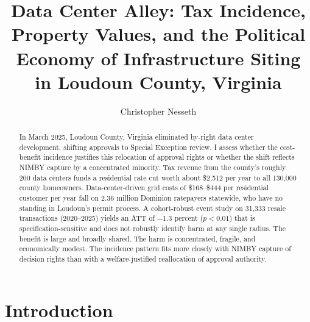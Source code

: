 \documentclass[12pt]{article}
\begin{document}
\title{Data Center Alley:
       Tax Incidence, Property Values, and the Political Economy
       of Infrastructure Siting in Loudoun County, Virginia}

\author{Christopher Nesseth}

\maketitle
\thispagestyle{empty}

\vfill

\begin{abstract}
\singlespacing
\noindent In March 2025, Loudoun County, Virginia eliminated by-right data center development, shifting approvals to Special Exception review. I assess whether the cost-benefit incidence justifies this relocation of approval rights or whether the shift reflects NIMBY capture by a concentrated minority. Tax revenue from the county's roughly 200 data centers funds a residential rate cut worth about \$2,512 per year to all 130,000 county homeowners. Data-center-driven grid costs of \$168--\$444 per residential customer per year fall on 2.36 million Dominion ratepayers statewide, who have no standing in Loudoun's permit process. A \citet{SunAbraham2021} cohort-robust event study on 31,333 resale transactions (2020--2025) yields an ATT of $-1.3$ percent ($p < 0.01$) that is specification-sensitive and does not robustly identify harm at any single radius. The benefit is large and broadly shared. The harm is concentrated, fragile, and economically modest. The incidence pattern fits more closely with NIMBY capture of decision rights than with a welfare-justified reallocation of approval authority.
\end{abstract}

\newpage
\setcounter{page}{1}


\section{Introduction}
\label{sec:intro}
\end{document}
